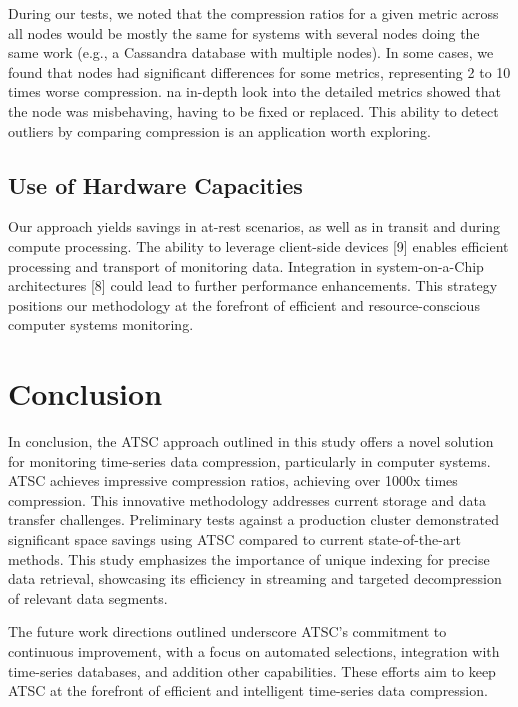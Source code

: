 \documentclass[conference]{IEEEtran}
\begin{document}
During our tests, we noted that the compression ratios for a given metric across all nodes would be mostly the same for systems with several nodes doing the same work (e.g., a Cassandra database with multiple nodes).
In some cases, we found that nodes had significant differences for some metrics, representing 2 to 10 times worse compression. na in-depth look into the detailed metrics showed that the node was misbehaving, having to be fixed 
or replaced. This ability to detect outliers by comparing compression is an application worth exploring.

\subsection{Use of Hardware Capacities}

Our approach yields savings in at-rest scenarios, as well as in transit and during compute processing. The ability to leverage client-side devices [9] enables efficient processing and transport of monitoring data. Integration in system-on-a-Chip architectures [8] could lead to further performance enhancements. This strategy positions our methodology at the forefront of efficient and resource-conscious computer systems monitoring.

\section{Conclusion}

In conclusion, the ATSC approach outlined in this study offers a novel solution for monitoring time-series data compression, particularly in computer systems. ATSC achieves impressive compression ratios, achieving over 1000x times compression. This innovative methodology addresses current storage and data transfer challenges.
\vspace{5pt}
Preliminary tests against a production cluster demonstrated significant space savings using ATSC compared to current state-of-the-art methods. This study emphasizes the importance of unique indexing for precise data retrieval, showcasing its efficiency in streaming and targeted decompression of relevant data segments.

The future work directions outlined underscore ATSC's commitment to continuous improvement, with a focus on automated selections, integration with time-series databases, and addition other capabilities. These efforts aim to keep ATSC at the forefront of efficient and intelligent time-series data compression.


\end{document}
